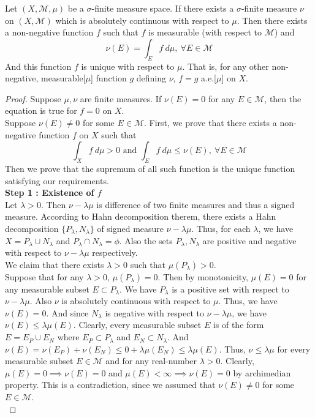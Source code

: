 \begin{theorem}
	Let $(X,\mathcal{M},\mu)$ be a $\sigma$-finite measure space.
	If there exists a $\sigma$-finite measure $\nu$ on $(X,\mathcal{M})$ which is absolutely continuous with respect to $\mu$.
	Then there exists a non-negative function $f$ such that $f$ is measurable (with respect to $\mathcal{M}$) and
	\begin{equation}
		\nu(E) = \int_E f \ d\mu,\ \forall E \in \mathcal{M} 
	\end{equation}
	And this function $f$ is unique with respect to $\mu$. That is, for any other non-negative, measurable[$\mu$] function $g$ defining $\nu$, $f = g$ a.e.[$\mu$] on $X$.
\end{theorem}
\begin{proof}
	Suppose $\mu,\nu$ are finite measures.
	If $\nu(E) = 0$ for any $E \in \mathcal{M}$, then the equation is true for $f = 0$ on $X$.\\

	Suppose $\nu(E) \ne 0$ for some $E \in \mathcal{M}$.
	First, we prove that there exists a non-negative function $f$ on $X$ such that
	\[ \int_X f \ d\mu > 0 \text{ and } \int_E f \ d\mu \le \nu(E),\ \forall E \in \mathcal{M} \]
	Then we prove that the supremum of all such function is the unique function satisfying our requirements.\\
	
	\textbf{Step 1 : Existence of $f$}\\
	Let $\lambda > 0$.
	Then $\nu - \lambda\mu$ is difference of two finite measures and thus a signed measure.
	According to Hahn decomposition therem, there exists a Hahn decomposition $\{ P_\lambda,N_\lambda\}$ of signed measure $\nu - \lambda\mu$.
	Thus, for each $\lambda$, we have $X = P_\lambda \cup N_\lambda$ and $P_\lambda \cap N_\lambda = \phi$.
	Also the sets $P_\lambda, N_\lambda$ are positive and negative with respect to $\nu-\lambda\mu$ respectively.\\

	We claim that there exists $\lambda > 0$ such that $\mu(P_\lambda) > 0$.\\
	Suppose that for any $\lambda > 0$, $\mu(P_\lambda) = 0$.
	Then by monotonicity, $\mu(E) = 0$ for any measurable subset $E \subset P_\lambda$.
	We have $P_\lambda$ is a positive set with respect to $\nu-\lambda\mu$. 
	Also $\nu$ is absolutely continuous with respect to $\mu$.
	Thus, we have $\nu(E)=0$.
	And since $N_\lambda$ is negative with respect to $\nu-\lambda\mu$, we have $\nu(E) \le \lambda\mu(E)$.
	Clearly, every measurable subset $E$ is of the form $E = E_P \cup E_N$ where $E_P \subset P_\lambda$ and $E_N \subset N_\lambda$.
	And $\nu(E)=\nu(E_P) + \nu(E_N) \le 0+\lambda\mu(E_N) \le \lambda\mu(E)$.
	Thus, $\nu \le \lambda\mu$ for every measurable subset $E \in \mathcal{M}$ and for any real-number $\lambda > 0$.
	Clearly, $\mu(E) = 0 \implies \nu(E) = 0$ and $\mu(E) < \infty \implies \nu(E) = 0$ by archimedian property.
	This is a contradiction, since we assumed that $\nu(E) \ne 0$ for some $E \in \mathcal{M}$.\\


\end{proof}
